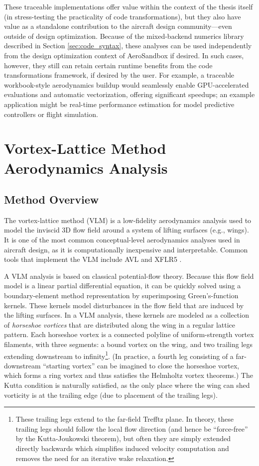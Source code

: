 These traceable implementations offer value within the context of the thesis itself (in stress-testing the practicality of code transformations), but they also have value as a standalone contribution to the aircraft design community—even outside of design optimization. Because of the mixed-backend numerics library described in Section \ref{sec:code_syntax}, these analyses can be used independently from the design optimization context of AeroSandbox if desired. In such cases, however, they still can retain certain runtime benefits from the code transformations framework, if desired by the user. For example, a traceable workbook-style aerodynamics buildup would seamlessly enable GPU-accelerated evaluations and automatic vectorization, offering significant speedups; an example application might be real-time performance estimation for model predictive controllers or flight simulation.

\section{Vortex-Lattice Method Aerodynamics Analysis}

\subsection{Method Overview}

The vortex-lattice method (VLM) is a low-fidelity aerodynamics analysis used to model the inviscid 3D flow field around a system of lifting surfaces (e.g., wings). It is one of the most common conceptual-level aerodynamics analyses used in aircraft design, as it is computationally inexpensive and interpretable. Common tools that implement the VLM include AVL \cite{avl} and XFLR5 \cite{xflr5}.

A VLM analysis is based on classical potential-flow theory. Because this flow field model is a linear partial differential equation, it can be quickly solved using a boundary-element method representation by superimposing Green's-function kernels. These kernels model disturbances in the flow field that are induced by the lifting surfaces. In a VLM analysis, these kernels are modeled as a collection of \emph{horseshoe vortices} that are distributed along the wing in a regular lattice pattern. Each horseshoe vortex is a connected polyline of uniform-strength vortex filaments, with three segments: a bound vortex on the wing, and two trailing legs extending downstream to infinity\footnote{These trailing legs extend to the far-field Trefftz plane. In theory, these trailing legs should follow the local flow direction (and hence be ``force-free'' by the Kutta-Joukowski theorem), but often they are simply extended directly backwards which simplifies induced velocity computation and removes the need for an iterative wake relaxation.}. (In practice, a fourth leg consisting of a far-downstream ``starting vortex'' can be imagined to close the horseshoe vortex, which forms a ring vortex and thus satisfies the Helmholtz vortex theorems.) The Kutta condition is naturally satisfied, as the only place where the wing can shed vorticity is at the trailing edge (due to placement of the trailing legs).

